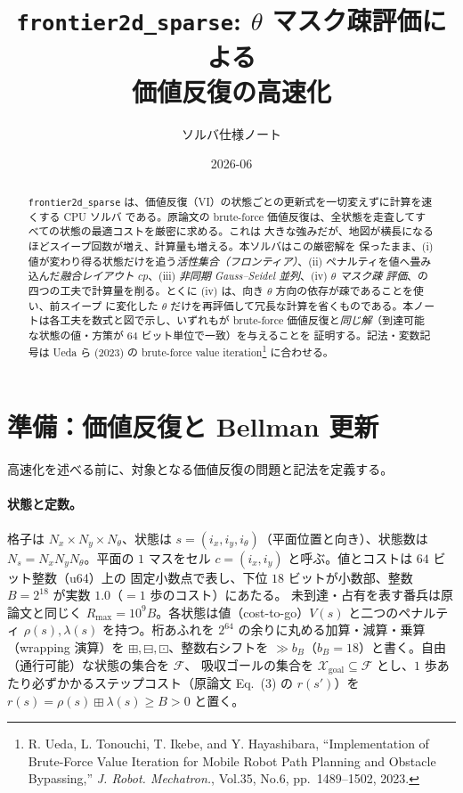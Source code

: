 \documentclass[11pt]{ltjsarticle}
\title{\texttt{frontier2d\_sparse}: $\theta$ マスク疎評価による\\価値反復の高速化}
\author{ソルバ仕様ノート}
\date{2026-06}
\newcommand{\wadd}{\mathbin{\boxplus}}
\newcommand{\wsub}{\mathbin{\boxminus}}
\newcommand{\wmul}{\mathbin{\boxdot}}
\newcommand{\Rmax}{R_{\max}}        %
\newcommand{\Xgoal}{\mathcal{X}_{\mathrm{goal}}}
\begin{document}
\maketitle

\begin{abstract}
\texttt{frontier2d\_sparse} は、価値反復（VI）の状態ごとの更新式を一切変えずに計算を速くする CPU ソルバ
である。原論文の brute-force 価値反復は、全状態を走査してすべての状態の最適コストを厳密に求める。これは
大きな強みだが、地図が横長になるほどスイープ回数が増え、計算量も増える。本ソルバはこの厳密解を
保ったまま、(i) 値が変わり得る状態だけを追う\emph{活性集合（フロンティア）}、(ii) ペナルティを値へ畳み
込んだ\emph{融合レイアウト $cp$}、(iii) \emph{非同期 Gauss--Seidel 並列}、(iv) \emph{$\theta$ マスク疎
評価}、の四つの工夫で計算量を削る。とくに (iv) は、向き $\theta$ 方向の依存が疎であることを使い、前スイープ
に変化した $\theta$ だけを再評価して冗長な計算を省くものである。本ノートは各工夫を数式と図で示し、いずれもが
brute-force 価値反復と\emph{同じ解}（到達可能な状態の値・方策が $64$ ビット単位で一致）を与えることを
証明する。記法・変数記号は Ueda ら (2023) の brute-force value iteration\footnote{R. Ueda, L. Tonouchi,
T. Ikebe, and Y. Hayashibara, ``Implementation of Brute-Force Value Iteration for Mobile Robot Path
Planning and Obstacle Bypassing,'' \textit{J. Robot. Mechatron.}, Vol.35, No.6, pp.~1489--1502, 2023.}
に合わせる。
\end{abstract}

\tableofcontents

\section{準備：価値反復と Bellman 更新}
\label{sec:pre}

高速化を述べる前に、対象となる価値反復の問題と記法を定義する。

\paragraph{状態と定数。}
格子は $N_x\times N_y\times N_\theta$、状態は $s=(i_x,i_y,i_\theta)$（平面位置と向き）、状態数は
$N_s=N_x N_y N_\theta$。平面の $1$ マスをセル $c=(i_x,i_y)$ と呼ぶ。値とコストは $64$ ビット整数（u64）上の
固定小数点で表し、下位 $18$ ビットが小数部、整数 $B=2^{18}$ が実数 $1.0$（$=1$ 歩のコスト）にあたる。
未到達・占有を表す番兵は原論文と同じく $\Rmax=10^9 B$。各状態は値（cost-to-go）$V(s)$ と二つのペナルティ
$\rho(s),\lambda(s)$ を持つ。桁あふれを $2^{64}$ の余りに丸める加算・減算・乗算（wrapping 演算）を
$\wadd,\wsub,\wmul$、整数右シフトを $\gg b_B$（$b_B=18$）と書く。自由（通行可能）な状態の集合を $\mathcal{F}$、
吸収ゴールの集合を $\Xgoal\subseteq\mathcal{F}$ とし、$1$ 歩あたり必ずかかるステップコスト（原論文 Eq.~(3)
の $r(s')$）を $r(s)=\rho(s)\wadd\lambda(s)\ge B>0$ と置く。
\end{document}
